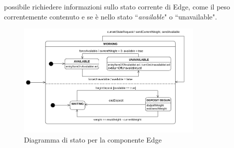 \documentclass[a4paper, 12pt]{report}
\begin{document}
			possibile richiedere informazioni sullo stato corrente di Edge, come il peso correntemente
			contenuto e se è nello stato ``\textit{available}" o ``unavailable".\newline
			\begin{figure}[H]
				\centering
				\includegraphics[width=0.8\textwidth]{"img/EdgeStatechart.png"}    
				\caption{Diagramma di stato per la componente Edge}
			\end{figure}
\end{document}
